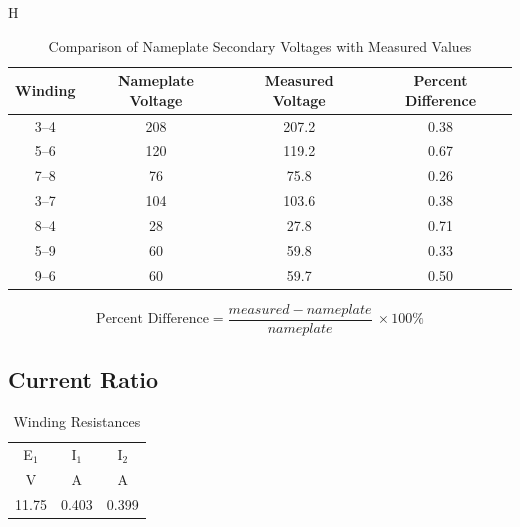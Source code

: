 \documentclass{article}
\begin{document}
\begin{table}{H}
  \centering
  \begin{tabular}{cccc}
    \hline
    Winding & Nameplate Voltage & Measured Voltage & Percent Difference \\
    \hline
    3--4 & 208 & 207.2 & 0.38 \\
    5--6 & 120 & 119.2 & 0.67 \\
    7--8 & 76  & 75.8  & 0.26 \\
    3--7 & 104 & 103.6 & 0.38 \\
    8--4 & 28  & 27.8  & 0.71 \\
    5--9 & 60  & 59.8  & 0.33 \\
    9--6 & 60  & 59.7  & 0.50 \\
  \end{tabular}
  \caption{Comparison of Nameplate Secondary Voltages with Measured Values}
  \label{tab:volt_rat}
\end{table}

\[\text{Percent Difference} = \frac{measured - nameplate}{nameplate}\ \times \text{100\%}\]

\subsection{Current Ratio}
\begin{table}[H]
  \centering
  \begin{tabular}{ccc}
    \hline
    E$_1$ & I$_1$ & I$_2$ \\
    V & A & A \\
    \hline
    11.75 & 0.403 & 0.399 \\
  \end{tabular}
  \caption{Winding Resistances}
  \label{tab:curr_rat}
\end{table}
\end{document}
